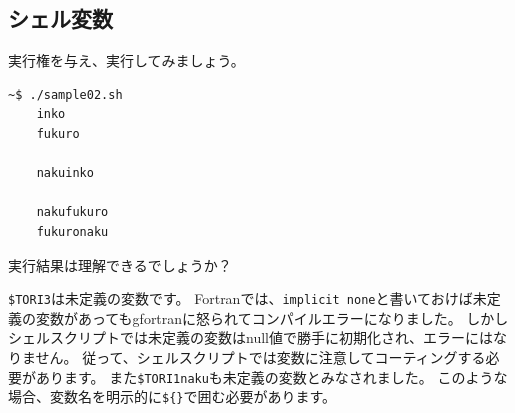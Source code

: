 \documentclass[a4j]{ltjsreport}
\begin{document}
    \subsection{シェル変数}


    

    実行権を与え、実行してみましょう。
    \begin{lstlisting}[numbers=none]
    ~$ ./sample02.sh
    inko
    fukuro
    
    nakuinko
    
    nakufukuro
    fukuronaku
    \end{lstlisting}

    実行結果は理解できるでしょうか？

    \texttt{\$TORI3}は未定義の変数です。
    Fortranでは、\texttt{implicit none}と書いておけば未定義の変数があってもgfortranに怒られてコンパイルエラーになりました。
    しかしシェルスクリプトでは未定義の変数はnull値で勝手に初期化され、エラーにはなりません。
    従って、シェルスクリプトでは変数に注意してコーティングする必要があります。
    また\texttt{\$TORI1naku}も未定義の変数とみなされました。
    このような場合、変数名を明示的に\texttt{\$\{\quad\}}で囲む必要があります。


\end{document}

